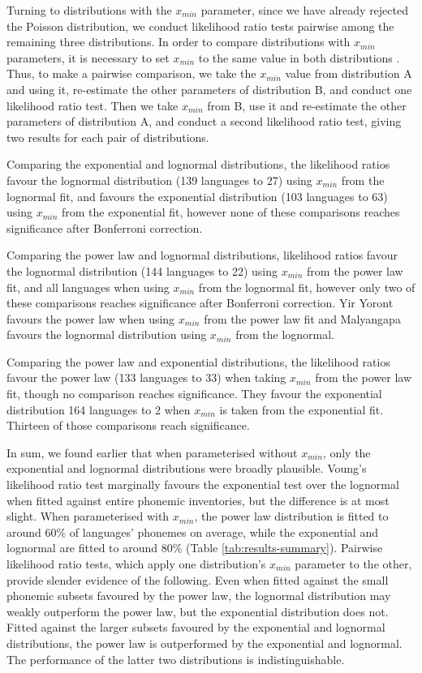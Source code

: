 Turning to distributions with the \(x_{min}\) parameter, since we have already rejected the Poisson distribution, we conduct likelihood ratio tests pairwise among the remaining three distributions. In order to compare distributions with \(x_{min}\) parameters, it is necessary to set \(x_{min}\) to the same value in both distributions \autocite{gillespie_fitting_2014}. Thus, to make a pairwise comparison, we take the \(x_{min}\) value from distribution A and using it, re-estimate the other parameters of distribution B, and conduct one likelihood ratio test. Then we take \(x_{min}\) from B, use it and re-estimate the other parameters of distribution A, and conduct a second likelihood ratio test, giving two results for each pair of distributions.

Comparing the exponential and lognormal distributions, the likelihood ratios favour the lognormal distribution (139 languages to 27) using \(x_{min}\) from the lognormal fit, and favours the exponential distribution (103 languages to 63) using \(x_{min}\) from the exponential fit, however none of these comparisons reaches significance after Bonferroni correction.

Comparing the power law and lognormal distributions, likelihood ratios favour the lognormal distribution (144 languages to 22) using \(x_{min}\) from the power law fit, and all languages when using \(x_{min}\) from the lognormal fit, however only two of these comparisons reaches significance after Bonferroni correction. Yir Yoront favours the power law when using \(x_{min}\) from the power law fit and Malyangapa favours the lognormal distribution using \(x_{min}\) from the lognormal.

Comparing the power law and exponential distributions, the likelihood ratios favour the power law (133 languages to 33) when taking \(x_{min}\) from the power law fit, though no comparison reaches significance. They favour the exponential distribution 164 languages to 2 when \(x_{min}\) is taken from the exponential fit. Thirteen of those comparisons reach significance.

In sum, we found earlier that when parameterised without \(x_{min}\), only the exponential and lognormal distributions were broadly plausible. Voung's likelihood ratio test marginally favours the exponential test over the lognormal when fitted against entire phonemic inventories, but the difference is at most slight. When parameterised with \(x_{min}\), the power law distribution is fitted to around 60\% of languages' phonemes on average, while the exponential and lognormal are fitted to around 80\% (Table \ref{tab:results-summary}). Pairwise likelihood ratio tests, which apply one distribution's \(x_{min}\) parameter to the other, provide slender evidence of the following. Even when fitted against the small phonemic subsets favoured by the power law, the lognormal distribution may weakly outperform the power law, but the exponential distribution does not. Fitted against the larger subsets favoured by the exponential and lognormal distributions, the power law is outperformed by the exponential and lognormal. The performance of the latter two distributions is indistinguishable.

